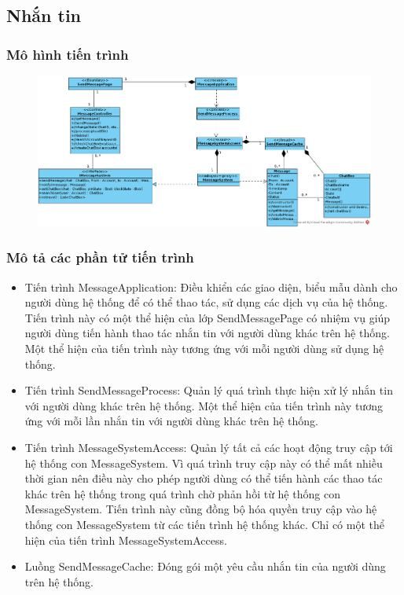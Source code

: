 \documentclass[./../main_file.tex]{subfiles}
\begin{document}
\subsection{Nhắn tin}

\subsubsection{Mô hình tiến trình}

\begin{figure}[H]
	\centering
	\includegraphics[width=\linewidth]{./images/pv_Message.png}
\end{figure}

\subsubsection{Mô tả các phần tử tiến trình}
\begin{itemize}
	\item Tiến trình MessageApplication: Điều khiển các giao diện, biểu mẫu dành cho người dùng hệ thống để có thể thao tác, sử dụng các dịch vụ của hệ thống. Tiến trình này có một thể hiện của lớp SendMessagePage có nhiệm vụ giúp người dùng tiến hành thao tác nhắn tin với người dùng khác trên hệ thống.
	Một thể hiện của tiến trình này tương ứng với mỗi người dùng sử dụng hệ thống.
	\item Tiến trình SendMessageProcess: Quản lý quá trình thực hiện xử lý nhắn tin với người dùng khác trên hệ thống.
	Một thể hiện của tiến trình này tương ứng với mỗi lần nhắn tin với người dùng khác trên hệ thống.
	\item Tiến trình MessageSystemAccess: Quản lý tất cả các hoạt động truy cập tới hệ thống con MessageSystem. Vì quá trình truy cập này có thể mất nhiều thời gian nên điều này cho phép người dùng có thể tiến hành các thao tác khác trên hệ thống trong quá trình chờ phản hồi từ hệ thống con MessageSystem. Tiến trình này cũng đồng bộ hóa quyền truy cập vào hệ thống con MessageSystem từ các tiến trình hệ thống khác.
	Chỉ có một thể hiện của tiến trình MessageSystemAccess.
	\item Luồng SendMessageCache: Đóng gói một yêu cầu nhắn tin của người dùng trên hệ thống.
\end{itemize}
\end{document}
